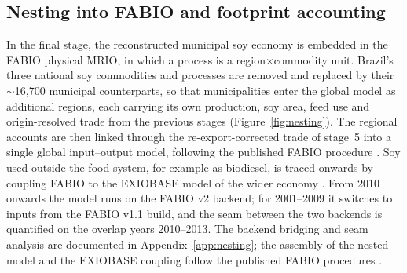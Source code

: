 \documentclass[pdflatex,sn-nature]{sn-jnl}%
\begin{document}
\subsection{Nesting into FABIO and footprint accounting}\label{subsec:fabio}
In the final stage, the reconstructed municipal soy economy is embedded in
the FABIO physical MRIO, in which a process is a
region$\times$commodity unit. Brazil's three national soy commodities and
processes are removed and replaced by their $\sim$16{,}700 municipal
counterparts, so that municipalities enter the global model as additional
regions, each carrying its own production, soy area, feed use and
origin-resolved trade from the previous stages (Figure~\ref{fig:nesting}).
The regional accounts are then linked through the re-export-corrected
trade of stage~5 into a single global input--output model, following the
published FABIO procedure \cite{bruckner2019fabio}. Soy used outside the
food system, for example as biodiesel, is traced onwards by coupling FABIO
to the EXIOBASE model of the wider economy \cite{stadler2018exiobase}.
From 2010 onwards the model runs on the FABIO
v2 backend; for 2001--2009 it switches to inputs from the FABIO v1.1 build,
and the seam between the two backends is quantified on the overlap years
2010--2013. \textcolor{green!50!black}{The backend bridging and seam
analysis are documented in Appendix~\ref{app:nesting}; the assembly of
the nested model and the EXIOBASE coupling follow the published FABIO
procedures \cite{bruckner2019fabio,stadler2018exiobase}.}
\end{document}
